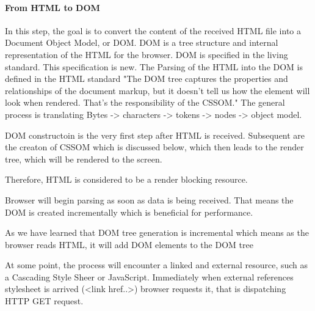 

\paragraph{From HTML to DOM}


In this step, the goal is to convert the content of the received HTML file into a Document Object Model, or DOM.
DOM is a tree structure and internal representation of the HTML for the browser. %
DOM is specified in the living standard. %
This specification is new.
The Parsing of the HTML into the DOM is defined in the HTML standard %
"The DOM tree captures the properties and relationships of the document markup, but it doesn't tell us how the element will look when rendered. 
That’s the responsibility of the CSSOM."
The general process is translating Bytes -> characters -> tokens -> nodes -> object model. %



DOM constructoin is the very first step after HTML is received.
Subsequent are the creaton of CSSOM which is discussed below, which then leads to the render tree, which will be rendered to the screen.

Therefore, HTML is considered to be a render blocking resource. %



Browser will begin parsing as soon as data is being received. %
That means the DOM is created incrementally which is beneficial for performance.

As we have learned that DOM tree generation is incremental which means as the browser reads HTML, it will add DOM elements to the DOM tree



At some point, the process will encounter a linked and external resource, such as a Cascading Style Sheer or JavaScript.
Immediately when external references stylesheet is arrived (<link href..>) browser requests it, that is dispatching HTTP GET request.

